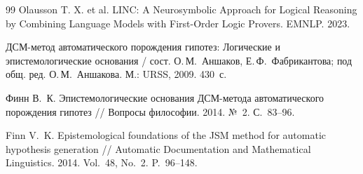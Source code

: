 \documentclass[12pt,a4paper]{article}
\begin{document}
\begin{thebibliography}{99}
	 Olausson T. X. et al. LINC: A Neurosymbolic Approach for Logical Reasoning by Combining Language Models with First-Order Logic Provers. EMNLP. 2023.

	 ДСМ-метод автоматического порождения гипотез: Логические и эпистемологические основания / сост. О.\,М.~Аншаков, Е.\,Ф.~Фабрикантова; под общ. ред. О.\,М.~Аншакова. М.: URSS, 2009. 430~с.

	 Финн В.~К. Эпистемологические основания ДСМ-метода автоматического порождения гипотез // Вопросы философии. 2014. №~2. С.~83--96.

	 Finn V.~K. Epistemological foundations of the JSM method for automatic hypothesis generation // Automatic Documentation and Mathematical Linguistics. 2014. Vol.~48, No.~2. P.~96--148.

	\end{thebibliography}
\end{document}
